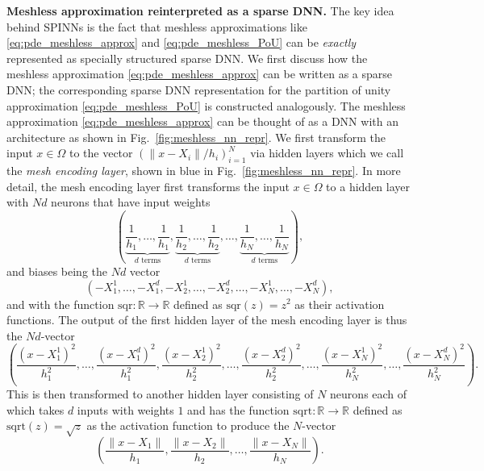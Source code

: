 \documentclass[12pt]{article}
\begin{document}
\textbf{Meshless approximation reinterpreted as a sparse DNN.} The key idea behind SPINNs is the fact that meshless approximations like \eqref{eq:pde_meshless_approx} and \eqref{eq:pde_meshless_PoU} can be \emph{exactly} represented as specially structured sparse DNN. We first discuss how the meshless approximation \eqref{eq:pde_meshless_approx} can be written as a sparse DNN; the corresponding sparse DNN representation for the partition of unity approximation \eqref{eq:pde_meshless_PoU} is constructed analogously. The meshless approximation \eqref{eq:pde_meshless_approx} can be thought of as a DNN with an architecture as shown in Fig.~\ref{fig:meshless_nn_repr}.  We first transform the input  $x \in \Omega$ to the vector $(\lVert x - X_i\rVert/h_i)_{i=1}^N$ via hidden layers which we call the \emph{mesh encoding layer}, shown in blue in Fig.~\ref{fig:meshless_nn_repr}. In more detail, the mesh encoding layer first transforms the input $x \in \Omega$ to a hidden layer with $Nd$ neurons that have input weights 
\begin{displaymath}
\left(\underbrace{\frac{1}{h_1}, \ldots, \frac{1}{h_1}}_{\text{$d$ terms}}, \underbrace{\frac{1}{h_2}, \ldots, \frac{1}{h_2}}_{\text{$d$ terms}}, \ldots, \underbrace{\frac{1}{h_N}, \ldots, \frac{1}{h_N}}_{\text{$d$ terms}} \right),
\end{displaymath}
and biases being the $Nd$ vector
\begin{displaymath}
(-X_1^1, \ldots, -X_1^d, -X_2^1, \ldots, -X_2^d, \ldots, -X_N^1, \ldots, -X_N^d),
\end{displaymath}
and with the function $\text{sqr}:\mathbb{R} \to \mathbb{R}$ defined as $\text{sqr}(z) = z^2$ as their activation functions. The output of the first hidden layer of the mesh encoding layer is thus the $Nd$-vector
\begin{displaymath}
\left(\frac{(x - X_1^1)^2}{h_1^2}, \ldots, \frac{(x - X_1^d)^2}{h_1^2}, \frac{(x - X_2^1)^2}{h_2^2}, \ldots, \frac{(x - X_2^d)^2}{h_2^2}, \ldots, \frac{(x - X_N^1)^2}{h_N^2}, \ldots, \frac{(x - X_N^d)^2}{h_N^2}\right).
\end{displaymath}
This is then transformed to another hidden layer consisting of $N$ neurons each of which takes $d$ inputs with weights $1$ and has the function $\text{sqrt}:\mathbb{R} \to \mathbb{R}$ defined as $\text{sqrt}(z) = \sqrt{z}$ as the activation function to produce the $N$-vector
\begin{displaymath}
\left(\frac{\lVert x - X_1\rVert}{h_1}, \frac{\lVert x - X_2\rVert}{h_2}, \ldots, \frac{\lVert x - X_N\rVert}{h_N}\right).
\end{displaymath}
\end{document}
